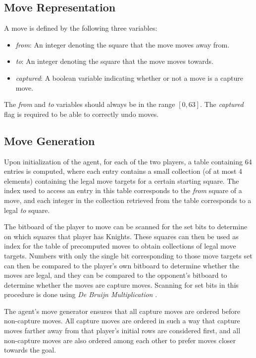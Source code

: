 \documentclass{article}
\begin{document}
\subsection{Move Representation}
A move is defined by the following three variables:
\begin{itemize}
\item \emph{from}: An integer denoting the square that the move moves away from.
\item \emph{to}: An integer denoting the square that the move moves towards.
\item \emph{captured}: A boolean variable indicating whether or not a move is a capture move.
\end{itemize}
The \emph{from} and \emph{to} variables should always be in the range $[0, 63]$. The \emph{captured} flag is required to be able to correctly undo moves.

\subsection{Move Generation}
Upon initialization of the agent, for each of the two players, a table containing 64 entries is computed, where each entry contains a small collection (of at most 4 elements) containing the legal move targets for a certain starting square. The index used to access an entry in this table corresponds to the \emph{from} square of a move, and each integer in the collection retrieved from the table corresponds to a legal \emph{to} square.

The bitboard of the player to move can be scanned for the set bits to determine on which squares that player has Knights. These squares can then be used as index for the table of precomputed moves to obtain collections of legal move targets. Numbers with only the single bit corresponding to those move targets set can then be compared to the player's own bitboard to determine whether the moves are legal, and they can be compared to the opponent's bitboard to determine whether the moves are capture moves. Scanning for set bits in this procedure is done using \emph{De Bruijn Multiplication} \cite{DeBruijnMultiplication}.

The agent's move generator ensures that all capture moves are ordered before non-capture moves. All capture moves are ordered in such a way that capture moves farther away from that player's initial rows are considered first, and all non-capture moves are also ordered among each other to prefer moves closer towards the goal.
\end{document}
